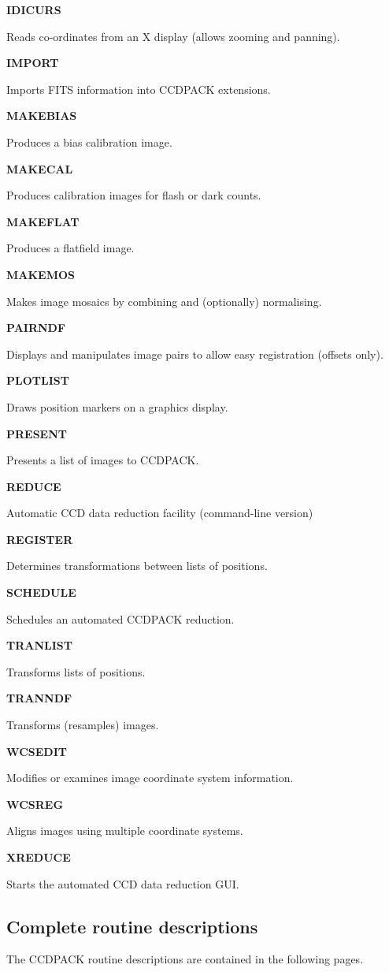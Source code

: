 \documentclass[twoside,11pt]{article}
\newenvironment{latexonly}{}{}
\renewcommand{\_}{\texttt{\symbol{95}}}
\newcommand{\quickdes}[3]{
                         \parbox{1.1in}{\bf #1}
                         \parbox{4.4in}{\raggedright #2 \dotfill}
                         \parbox{0.6in}{\pageref{#3}}
                         \vspace*{0.2in}}
\begin{document}
\begin{latexonly}
\quickdes{IDICURS}{Reads co-ordinates from an X display (allows
                   zooming and panning).}{IDICURS}

\quickdes{IMPORT}{Imports FITS information into CCDPACK extensions.}{IMPORT}

\quickdes{MAKEBIAS}{Produces a bias calibration image.}{MAKEBIAS}

\quickdes{MAKECAL}{Produces calibration images for flash or dark counts.}
                  {MAKECAL}

\quickdes{MAKEFLAT}{Produces a flatfield image.}
                   {MAKEFLAT}

\quickdes{MAKEMOS}{Makes image mosaics by combining and (optionally) 
                   normalising.}
                  {MAKEMOS}

\quickdes{PAIRNDF}{Displays and manipulates image pairs to allow easy
                   registration (offsets only).}
                  {PAIRNDF}

\quickdes{PLOTLIST}{Draws position markers on a graphics display.}
                   {PLOTLIST}

\quickdes{PRESENT}{Presents a list of images to CCDPACK.}{PRESENT}

\quickdes{REDUCE}{Automatic CCD data reduction facility (command-line version)}
                 {REDUCE}

\quickdes{REGISTER}{Determines transformations between lists of positions.}
                   {REGISTER}

\quickdes{SCHEDULE}{Schedules an automated CCDPACK reduction.}{SCHEDULE}

\quickdes{TRANLIST}{Transforms lists of positions.}
                   {TRANLIST}

\quickdes{TRANNDF}{Transforms (resamples) images.} {TRANNDF}

\quickdes{WCSEDIT}{Modifies or examines image coordinate system information.}
                  {WCSEDIT}

\quickdes{WCSREG}{Aligns images using multiple coordinate systems.}{WCSREG}

\quickdes{XREDUCE}{Starts the automated CCD data reduction GUI.}{XREDUCE}
\end{latexonly}

\subsection{Complete routine descriptions \label{descriptions}}

The CCDPACK routine descriptions are contained in the following pages.
\newpage
\end{document}

